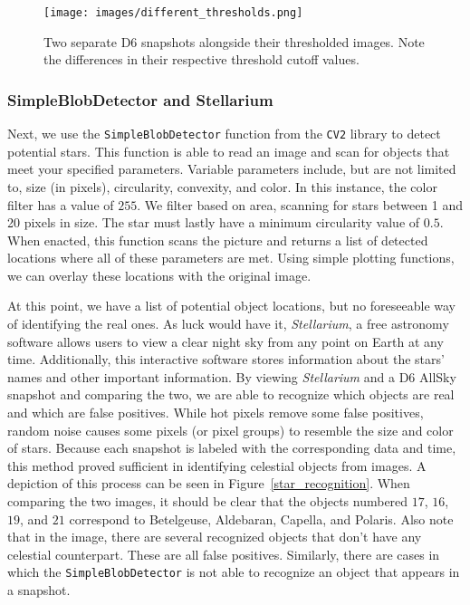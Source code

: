 \begin{figure}[ht!]
  \centering
  \texttt{[image: images/different\_thresholds.png]}
  \caption{Two separate D6 snapshots alongside their thresholded images.  Note the differences in their respective threshold cutoff values.}
  \label{dif_thresholds}
\end{figure}

\subsubsection{SimpleBlobDetector and Stellarium}

Next, we use the \texttt{SimpleBlobDetector} function from the \texttt{CV2} library to detect potential stars.
This function is able to read an image and scan for objects that meet your specified parameters.
Variable parameters include, but are not limited to, size (in pixels), circularity, convexity, and color.
In this instance, the color filter has a value of $255$.
We filter based on area, scanning for stars between 1 and 20 pixels in size.
The star must lastly have a minimum circularity value of $0.5$.
When enacted, this function scans the picture and returns a list of detected locations where all of these parameters are met.
Using simple plotting functions, we can overlay these locations with the original image.

At this point, we have a list of potential object locations, but no foreseeable way of identifying the real ones.
As luck would have it, \textit{Stellarium}, a free astronomy software allows users to view a clear night sky from any point on Earth at any time.
Additionally, this interactive software stores information about the stars' names and other important information.
By viewing \textit{Stellarium} and a D6 AllSky snapshot and comparing the two, we are able to recognize which objects are real and which are false positives.
While hot pixels remove some false positives, random noise causes some pixels (or pixel groups) to resemble the size and color of stars.
Because each snapshot is labeled with the corresponding data and time, this method proved sufficient in identifying celestial objects from images.
A depiction of this process can be seen in Figure~\ref{star_recognition}.  
When comparing the two images, it should be clear that the objects numbered $17$, $16$, $19$, and $21$ correspond to Betelgeuse, Aldebaran, Capella, and Polaris. 
Also note that in the image, there are several recognized objects that don't have any celestial counterpart.
These are all false positives.
Similarly, there are cases in which the \texttt{SimpleBlobDetector} is not able to recognize an object that appears in a snapshot.

